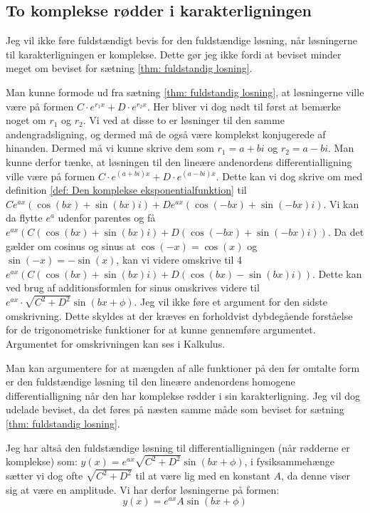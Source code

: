 \subsection{To komplekse rødder i karakterligningen}
\label{teori: Komplekse losninger i karakterligningen}
Jeg vil ikke føre fuldstændigt bevis for den fuldstændige løsning, når løsningerne til karakterligningen er komplekse. 
Dette gør jeg ikke fordi at beviset minder meget om beviset for sætning \ref{thm: fuldstandig losning}.

Man kunne formode ud fra sætning \ref{thm: fuldstandig losning}, at løsningerne ville være på formen $C\cdot e^{r_1 x} + D \cdot e^{r_2 x}$.
Her bliver vi dog nødt til først at bemærke noget om $r_1$ og $r_2$.
Vi ved at disse to er løsninger til den samme andengradsligning, og dermed må de også være komplekst konjugerede af hinanden. 
Dermed må vi kunne skrive dem som $r_1 = a + bi$ og $r_2 = a-bi$. 
Man kunne derfor tænke, at løsningen til den lineære andenordens differentialligning ville være på formen $C\cdot e^{(a+bi) x} + D \cdot e^{(a-bi)x}$.
Dette kan vi dog skrive om med definition \ref{def: Den komplekse eksponentialfunktion} til $Ce^{ax}(\cos(bx) + \sin(bx) i) + De^{ax}(\cos(-bx) + \sin(-bx) i)$.
Vi kan da flytte $e^{a}$ udenfor parentes og få 
$e^{ax}(C(\cos(bx) + \sin(bx) i) + D(\cos(-bx) + \sin(-bx) i))$.
Da det gælder om cosinus og sinus at $\cos(-x)=\cos(x)$ og $\sin(-x)=-\sin(x)$, kan vi videre omskrive til 4
$e^{ax}(C(\cos(bx) + \sin(bx) i) + D(\cos(bx) - \sin(bx) i))$. 
Dette kan ved brug af additionsformlen for sinus omskrives videre til $e^{ax}\cdot \sqrt{C^2 + D^2}\sin(bx+\phi)$. 
Jeg vil ikke føre et argument for den sidste omskrivning.
Dette skyldes at der kræves en forholdvist dybdegående forståelse for de trigonometriske funktioner for at kunne gennemføre argumentet. 
Argumentet for omskrivningen kan ses i Kalkulus.

Man kan argumentere for at mængden af alle funktioner på den før omtalte form er den fuldstændige løsning til den lineære andenordens homogene differentialligning når den har komplekse rødder i sin karakterligning. 
Jeg vil dog udelade beviset, da det føres på næsten samme måde som beviset for sætning \ref{thm: fuldstandig losning}. 

Jeg har altså den fuldstændige løsning til differentialligningen (når rødderne er komplekse) som:
$y(x) = e^{ax}\sqrt{C^2 + D^2}\sin(bx+\phi)$, i fysiksammehænge sætter vi dog ofte $\sqrt{C^2 + D^2}$ til at være lig med en konstant $A$, da denne viser sig at være en amplitude. 
Vi har derfor løsningerne på formen:
$$y(x) = e^{ax}A\sin(bx+\phi)$$


